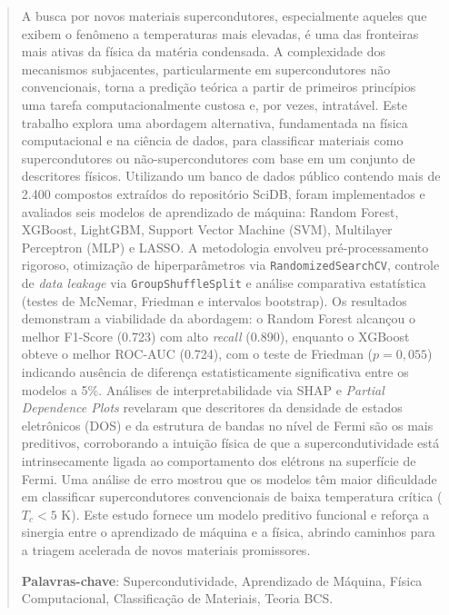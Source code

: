 \documentclass[12pt, a4paper, oneside]{report}
\begin{document}
\newpage
\begin{abstract}
\noindent
A busca por novos materiais supercondutores, especialmente aqueles que exibem o fenômeno a temperaturas mais elevadas, é uma das fronteiras mais ativas da física da matéria condensada. A complexidade dos mecanismos subjacentes, particularmente em supercondutores não convencionais, torna a predição teórica a partir de primeiros princípios uma tarefa computacionalmente custosa e, por vezes, intratável. Este trabalho explora uma abordagem alternativa, fundamentada na física computacional e na ciência de dados, para classificar materiais como supercondutores ou não-supercondutores com base em um conjunto de descritores físicos. Utilizando um banco de dados público contendo mais de 2.400 compostos extraídos do repositório SciDB, foram implementados e avaliados seis modelos de aprendizado de máquina: Random Forest, XGBoost, LightGBM, Support Vector Machine (SVM), Multilayer Perceptron (MLP) e LASSO. A metodologia envolveu pré-processamento rigoroso, otimização de hiperparâmetros via \texttt{RandomizedSearchCV}, controle de \textit{data leakage} via \texttt{GroupShuffleSplit} e análise comparativa estatística (testes de McNemar, Friedman e intervalos bootstrap). Os resultados demonstram a viabilidade da abordagem: o Random Forest alcançou o melhor F1-Score (0.723) com alto \textit{recall} (0.890), enquanto o XGBoost obteve o melhor ROC-AUC (0.724), com o teste de Friedman ($p = 0{,}055$) indicando ausência de diferença estatisticamente significativa entre os modelos a 5\%. Análises de interpretabilidade via SHAP e \textit{Partial Dependence Plots} revelaram que descritores da densidade de estados eletrônicos (DOS) e da estrutura de bandas no nível de Fermi são os mais preditivos, corroborando a intuição física de que a supercondutividade está intrinsecamente ligada ao comportamento dos elétrons na superfície de Fermi. Uma análise de erro mostrou que os modelos têm maior dificuldade em classificar supercondutores convencionais de baixa temperatura crítica ($T_c < 5$ K). Este estudo fornece um modelo preditivo funcional e reforça a sinergia entre o aprendizado de máquina e a física, abrindo caminhos para a triagem acelerada de novos materiais promissores.
\vspace{\baselineskip}

\noindent\textbf{Palavras-chave}: Supercondutividade, Aprendizado de Máquina, Física Computacional, Classificação de Materiais, Teoria BCS.
\end{abstract}
\end{document}
